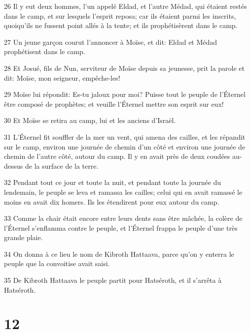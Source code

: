 \par 26 Il y eut deux hommes, l'un appelé Eldad, et l'autre Médad, qui étaient restés dans le camp, et sur lesquels l'esprit reposa; car ils étaient parmi les inscrits, quoiqu'ils ne fussent point allés à la tente; et ils prophétisèrent dans le camp.
\par 27 Un jeune garçon courut l'annoncer à Moïse, et dit: Eldad et Médad prophétisent dans le camp.
\par 28 Et Josué, fils de Nun, serviteur de Moïse depuis sa jeunesse, prit la parole et dit: Moïse, mon seigneur, empêche-les!
\par 29 Moïse lui répondit: Es-tu jaloux pour moi? Puisse tout le peuple de l'Éternel être composé de prophètes; et veuille l'Éternel mettre son esprit sur eux!
\par 30 Et Moïse se retira au camp, lui et les anciens d'Israël.
\par 31 L'Éternel fit souffler de la mer un vent, qui amena des cailles, et les répandit sur le camp, environ une journée de chemin d'un côté et environ une journée de chemin de l'autre côté, autour du camp. Il y en avait près de deux coudées au-dessus de la surface de la terre.
\par 32 Pendant tout ce jour et toute la nuit, et pendant toute la journée du lendemain, le peuple se leva et ramassa les cailles; celui qui en avait ramassé le moins en avait dix homers. Ils les étendirent pour eux autour du camp.
\par 33 Comme la chair était encore entre leurs dents sans être mâchée, la colère de l'Éternel s'enflamma contre le peuple, et l'Éternel frappa le peuple d'une très grande plaie.
\par 34 On donna à ce lieu le nom de Kibroth Hattaava, parce qu'on y enterra le peuple que la convoitise avait saisi.
\par 35 De Kibroth Hattaava le peuple partit pour Hatséroth, et il s'arrêta à Hatséroth.

\chapter{12}

